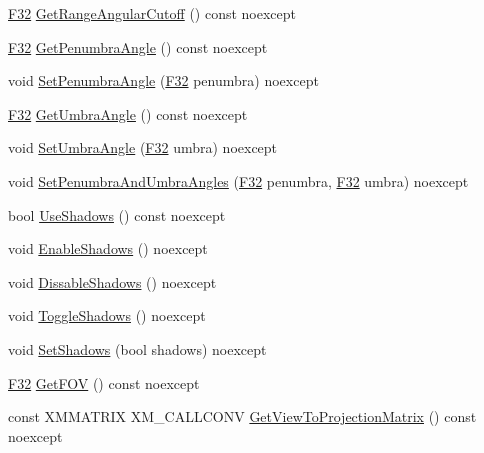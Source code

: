 \begin{DoxyCompactItemize}
\hyperlink{namespacemage_aa97e833b45f06d60a0a9c4fc22ae02c0}{F32} \hyperlink{classmage_1_1_spot_light_ada7b32eb18cc2bb6707a62c4ab72f4f2}{Get\+Range\+Angular\+Cutoff} () const noexcept
\item 
\hyperlink{namespacemage_aa97e833b45f06d60a0a9c4fc22ae02c0}{F32} \hyperlink{classmage_1_1_spot_light_a37d61501193f5ed4ecefe4015595ed89}{Get\+Penumbra\+Angle} () const noexcept
\item 
void \hyperlink{classmage_1_1_spot_light_a7de9894d815f8ac69cbfefc8656e8f8f}{Set\+Penumbra\+Angle} (\hyperlink{namespacemage_aa97e833b45f06d60a0a9c4fc22ae02c0}{F32} penumbra) noexcept
\item 
\hyperlink{namespacemage_aa97e833b45f06d60a0a9c4fc22ae02c0}{F32} \hyperlink{classmage_1_1_spot_light_ae29059615f77f1afe414dc826b2d2af8}{Get\+Umbra\+Angle} () const noexcept
\item 
void \hyperlink{classmage_1_1_spot_light_aab2685ef31177d7e40ef964fb9bc0e24}{Set\+Umbra\+Angle} (\hyperlink{namespacemage_aa97e833b45f06d60a0a9c4fc22ae02c0}{F32} umbra) noexcept
\item 
void \hyperlink{classmage_1_1_spot_light_a7510d29df641a651bab5f3d393e18b60}{Set\+Penumbra\+And\+Umbra\+Angles} (\hyperlink{namespacemage_aa97e833b45f06d60a0a9c4fc22ae02c0}{F32} penumbra, \hyperlink{namespacemage_aa97e833b45f06d60a0a9c4fc22ae02c0}{F32} umbra) noexcept
\item 
bool \hyperlink{classmage_1_1_spot_light_af41a8c0d83b45d048a2d1a030c1235f8}{Use\+Shadows} () const noexcept
\item 
void \hyperlink{classmage_1_1_spot_light_a51694c316560929e6ae49c019d3dc763}{Enable\+Shadows} () noexcept
\item 
void \hyperlink{classmage_1_1_spot_light_ae43668c2ae4c041b8abf822e15ab2185}{Dissable\+Shadows} () noexcept
\item 
void \hyperlink{classmage_1_1_spot_light_ae81d5d3c485a85f373d5b7b861919a3c}{Toggle\+Shadows} () noexcept
\item 
void \hyperlink{classmage_1_1_spot_light_a290ce2f0ce8814cac75f05322fc01cd5}{Set\+Shadows} (bool shadows) noexcept
\item 
\hyperlink{namespacemage_aa97e833b45f06d60a0a9c4fc22ae02c0}{F32} \hyperlink{classmage_1_1_spot_light_a6cbc0ac77c28796cc25a7131bfe4a1c1}{Get\+F\+OV} () const noexcept
\item 
const X\+M\+M\+A\+T\+R\+IX X\+M\+\_\+\+C\+A\+L\+L\+C\+O\+NV \hyperlink{classmage_1_1_spot_light_ae436e8fee37639e9218cc7f3822cebbd}{Get\+View\+To\+Projection\+Matrix} () const noexcept
\end{DoxyCompactItemize}
